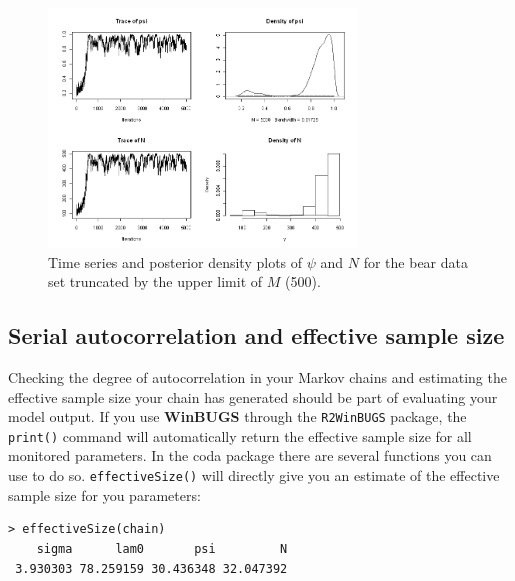 \begin{figure}
\begin{center}
\includegraphics[height=2.5in]{Ch7/figs/timeseries2}
\end{center}
\caption{Time series and posterior density plots of $\psi$ and $N$ for the bear data set truncated by the upper limit of $M$ (500).}
\label{timeseries2.fig}
\end{figure}

\subsection{Serial autocorrelation and effective sample size}

Checking the degree of autocorrelation in your Markov chains and 
estimating the effective sample size your chain has generated should 
be part of evaluating your model output. If you use {\bf WinBUGS}
 through the \mbox{\tt R2WinBUGS} package, the \verb#print()# command 
 will automatically return the effective sample size for all monitored 
 parameters. In the coda package there are several functions you can use 
 to do so. \verb#effectiveSize()# will directly give you an estimate 
 of the effective sample size for you parameters:
\begin{verbatim}
> effectiveSize(chain)
    sigma      lam0       psi         N
 3.930303 78.259159 30.436348 32.047392
\end{verbatim}

